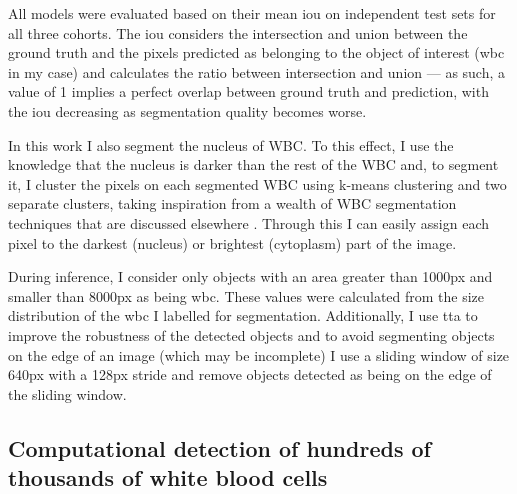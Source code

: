 All models were evaluated based on their mean \ac{iou} on independent test sets for all three cohorts. The \ac{iou} considers the intersection and union between the ground truth and the pixels predicted as belonging to the object of interest (\ac{wbc} in my case) and calculates the ratio between intersection and union --- as such, a value of 1 implies a perfect overlap between ground truth and prediction, with the \ac{iou} decreasing as segmentation quality becomes worse.

In this work I also segment the nucleus of WBC. To this effect, I use the knowledge that the nucleus is darker than the rest of the WBC and, to segment it, I cluster the pixels on each segmented WBC using k-means clustering and two separate clusters, taking inspiration from a wealth of WBC segmentation techniques that are discussed elsewhere \cite{Andrade2019-qv}. Through this I can easily assign each pixel to the darkest (nucleus) or brightest (cytoplasm) part of the image.

During inference, I consider only objects with an area greater than 1000px and smaller than 8000px as being \ac{wbc}. These values were calculated from the size distribution of the \ac{wbc} I labelled for segmentation. Additionally, I use \ac{tta} to improve the robustness of the detected objects and to avoid segmenting objects on the edge of an image (which may be incomplete) I use a sliding window of size 640px with a 128px stride and remove objects detected as being on the edge of the sliding window. 

\subsection{Computational detection of hundreds of thousands of white blood cells}

